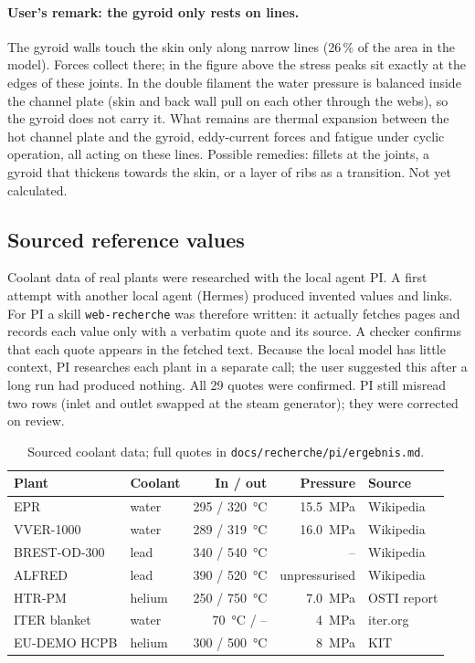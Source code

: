 \documentclass[10pt,a4paper]{article}
\begin{document}
\paragraph{User's remark: the gyroid only rests on lines.} The gyroid walls touch the skin only along narrow lines
(26\,\% of the area in the model). Forces collect there; in the figure above the stress peaks sit exactly at the
edges of these joints. In the double filament the water pressure is balanced inside the channel plate (skin and
back wall pull on each other through the webs), so the gyroid does not carry it. What remains are thermal expansion
between the hot channel plate and the gyroid, eddy-current forces and fatigue under cyclic operation, all acting on
these lines. Possible remedies: fillets at the joints, a gyroid that thickens towards the skin, or a layer of ribs
as a transition. Not yet calculated.

\subsection{Sourced reference values}
Coolant data of real plants were researched with the local agent PI. A first attempt with another local agent
(Hermes) produced invented values and links. For PI a skill \texttt{web-recherche} was therefore written: it
actually fetches pages and records each value only with a verbatim quote and its source. A checker confirms that
each quote appears in the fetched text. Because the local model has little context, PI researches each plant in a
separate call; the user suggested this after a long run had produced nothing. All 29 quotes were confirmed. PI
still misread two rows (inlet and outlet swapped at the steam generator); they were corrected on review.
\begin{table}[H]\centering\small
\begin{tabular}{llrrl}\toprule
Plant & Coolant & In / out & Pressure & Source\\\midrule
EPR & water & \SI{295}{} / \SI{320}{\celsius} & \SI{15.5}{MPa} & Wikipedia\\
VVER-1000 & water & \SI{289}{} / \SI{319}{\celsius} & \SI{16.0}{MPa} & Wikipedia\\
BREST-OD-300 & lead & \SI{340}{} / \SI{540}{\celsius} & -- & Wikipedia\\
ALFRED & lead & \SI{390}{} / \SI{520}{\celsius} & unpressurised & Wikipedia\\
HTR-PM & helium & \SI{250}{} / \SI{750}{\celsius} & \SI{7.0}{MPa} & OSTI report\\
ITER blanket & water & \SI{70}{\celsius} / -- & \SI{4}{MPa} & iter.org\\
EU-DEMO HCPB & helium & \SI{300}{} / \SI{500}{\celsius} & \SI{8}{MPa} & KIT\\\bottomrule
\end{tabular}\caption{Sourced coolant data; full quotes in \texttt{docs/recherche/pi/ergebnis.md}.}\end{table}
\end{document}
